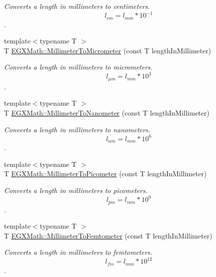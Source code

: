 \begin{DoxyCompactItemize}
\begin{DoxyCompactList}\small\item\em Converts a length in millimeters to centimeters. \[ l_{cm}=l_{mm} * 10^{-1} \]. \end{DoxyCompactList}\item 
{\footnotesize template$<$typename T $>$ }\\T \mbox{\hyperlink{group___e_g_x_math-_conversions-_length_conversions-_s_i-_millimeter-_s_i_gadec5d89ecdd6bfe638f54ceffe0e0630}{E\+G\+X\+Math\+::\+Millimeter\+To\+Micrometer}} (const T length\+In\+Millimeter)
\begin{DoxyCompactList}\small\item\em Converts a length in millimeters to micrometers. \[ l_{\mu m}=l_{mm} * 10^{3} \]. \end{DoxyCompactList}\item 
{\footnotesize template$<$typename T $>$ }\\T \mbox{\hyperlink{group___e_g_x_math-_conversions-_length_conversions-_s_i-_millimeter-_s_i_ga4ed79a00a348e87b09e55e34d852841c}{E\+G\+X\+Math\+::\+Millimeter\+To\+Nanometer}} (const T length\+In\+Millimeter)
\begin{DoxyCompactList}\small\item\em Converts a length in millimeters to nanometers. \[ l_{nm}=l_{mm} * 10^{6} \]. \end{DoxyCompactList}\item 
{\footnotesize template$<$typename T $>$ }\\T \mbox{\hyperlink{group___e_g_x_math-_conversions-_length_conversions-_s_i-_millimeter-_s_i_ga679e3714c229f1355a5c9bf707fcd723}{E\+G\+X\+Math\+::\+Millimeter\+To\+Picometer}} (const T length\+In\+Millimeter)
\begin{DoxyCompactList}\small\item\em Converts a length in millimeters to picometers. \[ l_{pm}=l_{mm} * 10^{9} \]. \end{DoxyCompactList}\item 
{\footnotesize template$<$typename T $>$ }\\T \mbox{\hyperlink{group___e_g_x_math-_conversions-_length_conversions-_s_i-_millimeter-_s_i_gaa6dd55424b685e10484ca46e394b2e92}{E\+G\+X\+Math\+::\+Millimeter\+To\+Femtometer}} (const T length\+In\+Millimeter)
\begin{DoxyCompactList}\small\item\em Converts a length in millimeters to femtometers. \[ l_{fm}=l_{mm} * 10^{12} \]. \end{DoxyCompactList}\item 

\end{DoxyCompactItemize}
